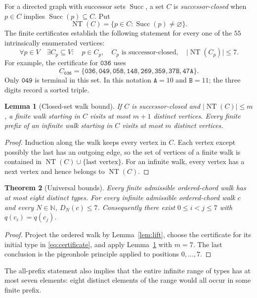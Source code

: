 \documentclass[11pt,letterpaper]{article}
\newtheorem{theorem}{Theorem}
\newtheorem{lemma}[theorem]{Lemma}
\theoremstyle{definition}\newtheorem{definition}[theorem]{Definition}
\newcommand{\N}{\mathbb N}
\newcommand{\typ}[1]{\mathtt{#1}}
\newcommand{\Succ}{\operatorname{Succ}}
\newcommand{\NT}{\operatorname{NT}}
\newcommand{\card}[1]{\lvert #1\rvert}
\begin{document}
For a directed graph with successor sets $\Succ$, a set $C$ is \emph{successor-closed} when $p\in C$ implies $\Succ(p)\subseteq C$. Put
\[
 \NT(C)=\{p\in C:\Succ(p)\ne\varnothing\}.
\]
The finite certificates establish the following statement for every one of the $55$ intrinsically enumerated vertices:
\begin{equation}\label{eq:certificate}
 \forall p\in V\quad\exists C_p\subseteq V:\quad
 p\in C_p,\quad C_p\text{ is successor-closed},\quad\card{\NT(C_p)}\leq7.
\end{equation}
For example, the certificate for $\typ{036}$ uses
\[
 C_{\typ{036}}=\{\typ{036},\typ{049},\typ{058},\typ{148},
 \typ{269},\typ{359},\typ{37B},\typ{47A}\}.
\]
Only $\typ{049}$ is terminal in this set. In this notation $\typ{A}=10$ and $\typ{B}=11$; the three digits record a sorted triple.

\begin{lemma}[Closed-set walk bound]\label{lem:closed}
If $C$ is successor-closed and $\card{\NT(C)}\leq m$, a finite walk starting in $C$ visits at most $m+1$ distinct vertices. Every finite prefix of an infinite walk starting in $C$ visits at most $m$ distinct vertices.
\end{lemma}
\begin{proof}
Induction along the walk keeps every vertex in $C$. Each vertex except possibly the last has an outgoing edge, so the set of vertices of a finite walk is contained in $\NT(C)\cup\{\text{last vertex}\}$. For an infinite walk, every vertex has a next vertex and hence belongs to $\NT(C)$.
\end{proof}

\begin{theorem}[Universal bounds]\label{thm:bounds}
Every finite admissible ordered-chord walk has at most eight distinct types. For every infinite admissible ordered-chord walk $c$ and every $N\in\N$, $D_N(c)\leq7$. Consequently there exist $0\leq i<j\leq7$ with $q(c_i)=q(c_j)$.
\end{theorem}
\begin{proof}
Project the ordered walk by Lemma~\ref{lem:lift}, choose the certificate for its initial type in \eqref{eq:certificate}, and apply Lemma~\ref{lem:closed} with $m=7$. The last conclusion is the pigeonhole principle applied to positions $0,\ldots,7$.
\end{proof}
The all-prefix statement also implies that the entire infinite range of types has at most seven elements: eight distinct elements of the range would all occur in some finite prefix.
\end{document}
